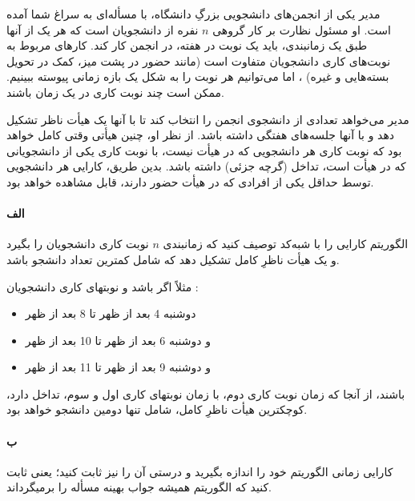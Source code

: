 \documentclass[]{article}
\begin{document}
مدیر یکی از انجمن‌های دانشجویی بزرگِ دانشگاه، با مسأله‌ای به سراغ شما آمده است.
او مسئول نظارت بر کار گروهی $n$ نفره از دانشجویان است
که هر یک از آنها طبق یک زمانبندی، باید یک نوبت در هفته، در انجمن کار کند.
کارهای مربوط به نوبت‌های کاری دانشجویان متفاوت است
(مانند حضور در پشت میز، کمک در تحویل بسته‌هایی و غیره) ،
اما می‌توانیم هر نوبت را به شکل یک بازه زمانی پیوسته ببینیم.
ممکن است چند نوبت کاری در یک زمان باشند.

مدیر می‌خواهد تعدادی از  دانشجوی انجمن را انتخاب کند تا با آنها یک هیأت ناظر تشکیل دهد
و با آنها جلسه‌های هفتگی داشته باشد. 
از نظر او، چنین هیأتی وقتی کامل خواهد بود که نوبت کاری هر دانشجویی که در هیأت نیست،
با نوبت کاری یکی از دانشجویانی که در هیأت است، تداخل (گرچه جزئی) داشته باشد.
بدین طریق، کارایی هر دانشجویی توسط حداقل یکی از افرادی که در هیأت حضور دارند، قابل مشاهده خواهد بود.

\paragraph*{الف}
الگوریتم کارایی را با شبه‌کد توصیف کنید که زمانبندی $n$ نوبت کاری دانشجویان را بگیرد 
و یک هیأت ناظرِ کامل تشکیل دهد که شامل کمترین تعداد دانشجو باشد.

مثلاً اگر  باشد و نوبتهای کاری دانشجویان :
\begin{itemize}
    \item دوشنبه 4 بعد از ظهر تا 8 بعد از ظهر
    \item و دوشنبه 6 بعد از ظهر تا 10 بعد از ظهر
    \item و دوشنبه 9 بعد از ظهر تا 11 بعد از ظهر
\end{itemize}
باشند، از آنجا که زمان نوبت کاری دوم، با زمان نوبتهای کاری اول و سوم، تداخل دارد،
کوچکترین هیأت ناظرِ کامل، شامل تنها دومین دانشجو خواهد بود.

\paragraph*{ب}
کارایی زمانی الگوریتم خود را اندازه بگیرید و درستی آن را نیز ثابت کنید؛
یعنی ثابت کنید که الگوریتم همیشه جواب بهینه مسأله را برمیگرداند.
\end{document}
